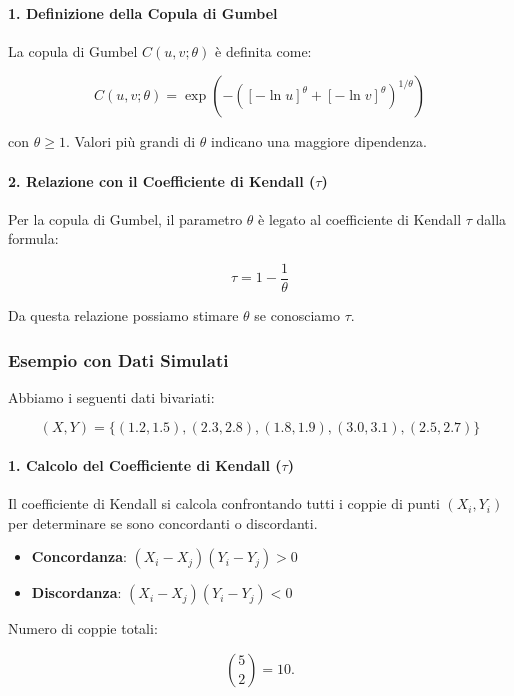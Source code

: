 \documentclass[%
	corpo=11pt,
    twoside,
    stile=classica,
    oldstyle,
    tipotesi=custom,
    greek,
    evenboxes,
]{toptesi}
\begin{document}
\paragraph{1. Definizione della Copula di Gumbel}

La copula di Gumbel \( C(u,v; \theta) \) è definita come:

\[
C(u,v; \theta) = \exp \left( - \left( [ -\ln u]^\theta + [-\ln v]^\theta \right)^{1/\theta} \right)
\]

con \( \theta \geq 1 \). Valori più grandi di \( \theta \) indicano una maggiore dipendenza.

\paragraph{2. Relazione con il Coefficiente di Kendall (\( \tau \))}

Per la copula di Gumbel, il parametro \( \theta \) è legato al coefficiente di Kendall \( \tau \) dalla formula:

\[
\tau = 1 - \frac{1}{\theta}
\]

Da questa relazione possiamo stimare \( \theta \) se conosciamo \( \tau \).

\subsubsection{Esempio con Dati Simulati}

Abbiamo i seguenti dati bivariati:

\[
(X, Y) = \{ (1.2, 1.5), (2.3, 2.8), (1.8, 1.9), (3.0, 3.1), (2.5, 2.7) \}
\]

\paragraph{1. Calcolo del Coefficiente di Kendall (\( \tau \))}

Il coefficiente di Kendall si calcola confrontando tutti i coppie di punti \( (X_i, Y_i) \) per determinare se sono concordanti o discordanti.

\begin{itemize}
	\item \textbf{Concordanza}: \( (X_i - X_j)(Y_i - Y_j) > 0 \)
	\item \textbf{Discordanza}: \( (X_i - X_j)(Y_i - Y_j) < 0 \)
\end{itemize}

Numero di coppie totali:

\[
\binom{5}{2} = 10.
\]
\end{document}
